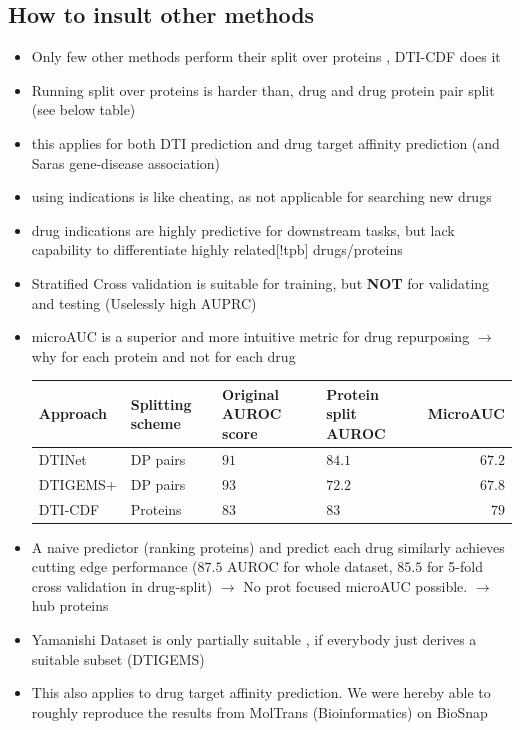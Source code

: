 \documentclass{bioinfo}
\begin{document}
\subsection{How to insult other methods}
\begin{itemize}
	\item Only few other methods perform their split over proteins \citep{Survey2018}, DTI-CDF does it
	\item Running split over proteins is harder than, drug and drug protein pair split (see below table)
	\item this applies for both DTI prediction and drug target affinity prediction (and Saras gene-disease association)
	\item using indications is like cheating, as not applicable for searching new drugs
	\item drug indications are highly predictive for downstream tasks, but lack capability to differentiate highly related[!tpb] drugs/proteins
	\item Stratified Cross validation is suitable for training, but \textbf{NOT} for validating and testing (Uselessly high AUPRC)
	\item microAUC is a superior and more intuitive metric for drug repurposing $\rightarrow$ why for each protein and not for each drug
	
	\begin{tabular}{|l|p{1cm}|p{1cm}|p{1cm}|r|}
		\hline
		Approach&Splitting scheme&Original AUROC score&Protein split AUROC&MicroAUC\\
		\hline
		DTINet&DP pairs&$91$&$84.1$&$67.2$\\
		DTIGEMS+&DP pairs&$93$& $72.2$& $67.8$ \\
		DTI-CDF&Proteins&$83$&$83$&$79$\\
		\hline
	\end{tabular}
	\item A naive predictor (ranking proteins) and predict each drug similarly achieves cutting edge performance ($87.5$ AUROC for whole dataset, $85.5$ for 5-fold cross validation in drug-split) $\rightarrow$ No prot focused microAUC possible. $\rightarrow$ hub proteins
	\item Yamanishi Dataset is only partially suitable , if everybody just derives a suitable subset (DTIGEMS)
	\item This also applies to drug target affinity prediction. We were hereby able to roughly reproduce the results from MolTrans (Bioinformatics) on BioSnap

\end{itemize}
\end{document}
